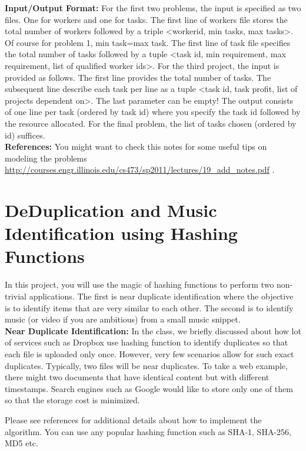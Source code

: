 \documentclass[12pt]{article}
\begin{document}
{\bf Input/Output Format:}  For the first two problems, the input is specified as two files. One for workers and one for tasks. The first line of workers file stores the total number of workers followed by a triple \textless       workerid, min tasks, max tasks\textgreater. Of course for problem 1, min task=max task. The first line of task file specifies the total number of tasks followed by a tuple \textless task id, min requirement, max requirement, list of qualified worker ids\textgreater. For the third project, the input is provided as follows. The first line provides the total number of tasks. The subsequent line describe each task per line as a tuple \textless task id, task profit, list of projects dependent on\textgreater. The last parameter can be empty! The output consists of one line per task (ordered by task id) where you specify the task id followed by the resource allocated. For the final problem, the list of tasks chosen (ordered by id) suffices. \\

{\bf References:}
You might want to check this notes for some useful tips on modeling the problems \url{http://courses.engr.illinois.edu/cs473/sp2011/lectures/19_add_notes.pdf} .


\section{DeDuplication and Music Identification using Hashing Functions}
In this project, you will use the magic of hashing functions to perform two non-trivial applications.
The first is near duplicate identification where the objective is to identify items that are very similar to each other.
The second is to identify music (or video if you are ambitious) from a small music snippet.\\

{\bf Near Duplicate Identification:}
In the class, we briefly discussed about how lot of services such as Dropbox use hashing function to identify duplicates
so that each file is uploaded only once.
However, very few scenarios allow for such exact duplicates.
Typically, two files will be near duplicates.
To take a web example, there might two documents that have identical content but with different timestamps.
Search engines such as Google would like to store only one of them so that the storage cost is minimized.

Please see references for additional details about how to implement the algorithm.
You can use any popular hashing function such as SHA-1, SHA-256, MD5 etc.
\end{document}
